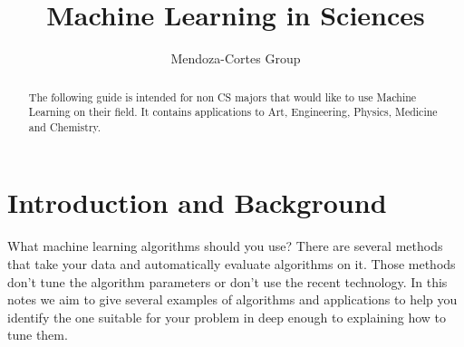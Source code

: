 \documentclass[11pt,letterpaper]{report}
\author{Mendoza-Cortes Group}
\title{Machine Learning in Sciences}
\begin{document}
	
	\setcounter{page}{1}
	\thispagestyle{empty}
	
	
	
	
	\maketitle
	
	\newpage
	
	\tableofcontents
	
	\listoftables
	
	\listoffigures
	
	
	\clearpage
	\newpage
	\setcounter{page}{1}
	\pagestyle{fancy}
	
	
	
	
	\begin{abstract}
		The following guide is intended for non CS majors that would like to use  Machine Learning on their field. It contains applications to Art, Engineering, Physics, Medicine and Chemistry.
	\end{abstract}
	
	\clearpage
	\newpage
	\chapter{Introduction and Background}
		What machine learning algorithms should you use? There are several methods that take your data and automatically evaluate algorithms on it. Those methods don't tune the algorithm parameters or don't use the recent technology. In this notes we aim to give several examples of algorithms and applications to help you identify the one suitable for your problem in deep enough to explaining how to tune them.
	
\end{document}
